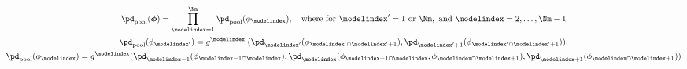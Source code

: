 \begin{gather}
  \pd_{\text{pool}}(\boldsymbol{\phi}) = 
    \prod_{\modelindex = 1}^{\Nm}
    \pd_{\text{pool}}(\phi_{\modelindex}),
  \quad  \text{where for } \modelindex' = 1 \text{ or } \Nm, \text{ and } \modelindex = 2, \ldots, \Nm - 1 \\
  \pd_{\text{pool}}(\phi_{\modelindex'}) =
    g^{\modelindex'}(\pd_{\modelindex'}(\phi_{\modelindex' \cap \modelindex' + 1}), \pd_{\modelindex' + 1}(\phi_{\modelindex' \cap \modelindex' + 1})),\\
  \pd_{\text{pool}}(\phi_{\modelindex}) =
    g^{\modelindex}(\pd_{\modelindex - 1}(\phi_{\modelindex - 1 \cap \modelindex}), \pd_{\modelindex}(\phi_{\modelindex - 1 \cap \modelindex}, \phi_{\modelindex \cap \modelindex + 1}), \pd_{\modelindex + 1}(\phi_{\modelindex \cap \modelindex + 1}))
  \label{eqn:bad-alterative-one}
\end{gather}